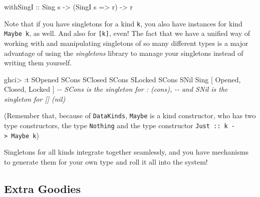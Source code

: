 \documentclass[]{article}
\newenvironment{Shaded}{}{}
\newcommand{\CommentTok}[1]{\textcolor[rgb]{0.38,0.63,0.69}{\textit{#1}}}
\newcommand{\DataTypeTok}[1]{\textcolor[rgb]{0.56,0.13,0.00}{#1}}
\newcommand{\NormalTok}[1]{#1}
\newcommand{\OperatorTok}[1]{\textcolor[rgb]{0.40,0.40,0.40}{#1}}
\newcommand{\OtherTok}[1]{\textcolor[rgb]{0.00,0.44,0.13}{#1}}
\begin{document}
\begin{Shaded}
\begin{Highlighting}[]
\OtherTok{withSingI ::} \DataTypeTok{Sing}\NormalTok{ s }\OtherTok{{-}>}\NormalTok{ (}\DataTypeTok{SingI}\NormalTok{ s }\OtherTok{=>}\NormalTok{ r) }\OtherTok{{-}>}\NormalTok{ r}
\end{Highlighting}
\end{Shaded}

Note that if you have singletons for a kind \texttt{k}, you also have instances
for kind \texttt{Maybe\ k}, as well. And also for \texttt{{[}k{]}}, even! The
fact that we have a unified way of working with and manipulating singletons of
so many different types is a major advantage of using the \emph{singletons}
library to manage your singletons instead of writing them yourself.

\begin{Shaded}
\begin{Highlighting}[]
\NormalTok{ghci}\OperatorTok{>} \OperatorTok{:}\NormalTok{t }\DataTypeTok{SOpened} \OtherTok{\textasciigrave{}SCons\textasciigrave{}} \DataTypeTok{SClosed} \OtherTok{\textasciigrave{}SCons\textasciigrave{}} \DataTypeTok{SLocked} \OtherTok{\textasciigrave{}SCons\textasciigrave{}} \DataTypeTok{SNil}
\DataTypeTok{Sing}\NormalTok{ \textquotesingle{}[ }\DataTypeTok{\textquotesingle{}Opened}\NormalTok{, }\DataTypeTok{\textquotesingle{}Closed}\NormalTok{, }\DataTypeTok{\textquotesingle{}Locked}\NormalTok{ ]}
\CommentTok{{-}{-} \textquotesingle{}SCons is the singleton for \textasciigrave{}:\textasciigrave{} (cons),}
\CommentTok{{-}{-} and \textquotesingle{}SNil is the singleton for \textasciigrave{}[]\textasciigrave{} (nil)}
\end{Highlighting}
\end{Shaded}

(Remember that, because of \texttt{DataKinds}, \texttt{Maybe} is a kind
constructor, who has two type constructors, the type
\texttt{\textquotesingle{}Nothing} and the type constructor
\texttt{\textquotesingle{}Just\ ::\ k\ -\textgreater{}\ Maybe\ k})

Singletons for all kinds integrate together seamlessly, and you have mechanisms
to generate them for your own type and roll it all into the system!

\hypertarget{extra-goodies}{%
\subsection{Extra Goodies}\label{extra-goodies}}
\end{document}
